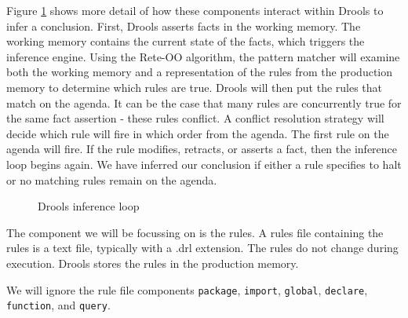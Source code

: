 Figure \ref{fig:Drools_inference_loop} shows more detail of how these components interact within Drools to infer a conclusion.
First, Drools asserts facts in the working memory.
The working memory contains the current state of the facts, which triggers the inference engine.
Using the Rete-OO algorithm, the pattern matcher will examine both the working memory and a representation of the rules from the production memory to determine which rules are true.
Drools will then put the rules that match on the agenda.
It can be the case that many rules are concurrently true for the same fact assertion - these rules conflict.
A conflict resolution strategy will decide which rule will fire in which order from the agenda.
The first rule on the agenda will fire.
If the rule modifies, retracts, or asserts a fact, then the inference loop begins again.
We have inferred our conclusion if either a rule specifies to halt or no matching rules remain on the agenda.

\begin{figure}[h]
    \centering
    \caption{Drools inference loop}
    \label{fig:Drools_inference_loop}
\end{figure}

The component we will be focussing on is the rules.
A rules file containing the rules is a text file, typically with a .drl extension.
The rules do not change during execution.
Drools stores the rules in the production memory.

\newpage 

We will ignore the rule file components \texttt{package}, \texttt{import}, \texttt{global}, \texttt{declare}, \texttt{function}, and \texttt{query}.

